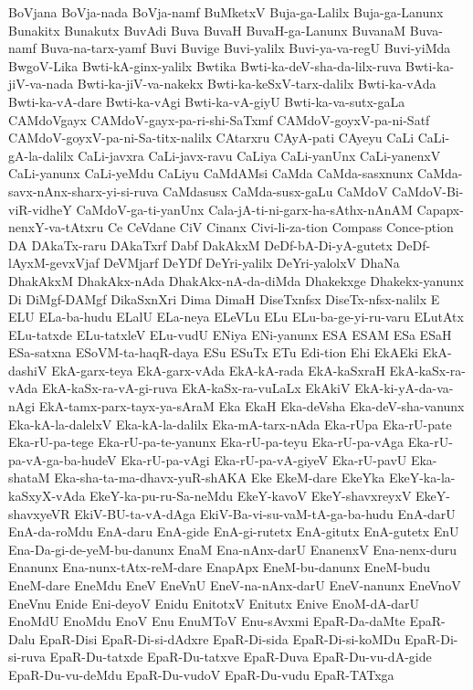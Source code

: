{BoVjana
BoVja-nada
BoVja-namf
BuMketxV
Buja-ga-Lalilx
Buja-ga-Lanunx
Bunakitx
Bunakutx
BuvAdi
Buva
BuvaH
BuvaH-ga-Lanunx
BuvanaM
Buva-namf
Buva-na-tarx-yamf
Buvi
Buvige
Buvi-yalilx
Buvi-ya-va-regU
Buvi-yiMda
BwgoV-Lika
Bwti-kA-ginx-yalilx
Bwtika
Bwti-ka-deV-sha-da-lilx-ruva
Bwti-ka-jiV-va-nada
Bwti-ka-jiV-va-nakekx
Bwti-ka-keSxV-tarx-dalilx
Bwti-ka-vAda
Bwti-ka-vA-dare
Bwti-ka-vAgi
Bwti-ka-vA-giyU
Bwti-ka-va-sutx-gaLa
CAMdoVgayx
CAMdoV-gayx-pa-ri-shi-SaTxmf
CAMdoV-goyxV-pa-ni-Satf
CAMdoV-goyxV-pa-ni-Sa-titx-nalilx
CAtarxru
CAyA-pati
CAyeyu
CaLi
CaLi-gA-la-dalilx
CaLi-javxra
CaLi-javx-ravu
CaLiya
CaLi-yanUnx
CaLi-yanenxV
CaLi-yanunx
CaLi-yeMdu
CaLiyu
CaMdAMsi
CaMda
CaMda-sasxnunx
CaMda-savx-nAnx-sharx-yi-si-ruva
CaMdasusx
CaMda-susx-gaLu
CaMdoV
CaMdoV-Bi-viR-vidheY
CaMdoV-ga-ti-yanUnx
Cala-jA-ti-ni-garx-ha-sAthx-nAnAM
Capapx-nenxY-va-tAtxru
Ce
CeVdane
CiV
Cinanx
Civi-li-za-tion
Compass
Conce-ption
DA
DAkaTx-raru
DAkaTxrf
Dabf
DakAkxM
DeDf-bA-Di-yA-gutetx
DeDf-lAyxM-gevxVjaf
DeVMjarf
DeYDf
DeYri-yalilx
DeYri-yalolxV
DhaNa
DhakAkxM
DhakAkx-nAda
DhakAkx-nA-da-diMda
Dhakekxge
Dhakekx-yanunx
Di
DiMgf-DAMgf
DikaSxnXri
Dima
DimaH
DiseTxnfsx
DiseTx-nfsx-nalilx
E
ELU
ELa-ba-hudu
ELalU
ELa-neya
ELeVLu
ELu
ELu-ba-ge-yi-ru-varu
ELutAtx
ELu-tatxde
ELu-tatxleV
ELu-vudU
ENiya
ENi-yanunx
ESA
ESAM
ESa
ESaH
ESa-satxna
ESoVM-ta-haqR-daya
ESu
ESuTx
ETu
Edi-tion
Ehi
EkAEki
EkA-dashiV
EkA-garx-teya
EkA-garx-vAda
EkA-kA-rada
EkA-kaSxraH
EkA-kaSx-ra-vAda
EkA-kaSx-ra-vA-gi-ruva
EkA-kaSx-ra-vuLaLx
EkAkiV
EkA-ki-yA-da-va-nAgi
EkA-tamx-parx-tayx-ya-sAraM
Eka
EkaH
Eka-deVsha
Eka-deV-sha-vanunx
Eka-kA-la-dalelxV
Eka-kA-la-dalilx
Eka-mA-tarx-nAda
Eka-rUpa
Eka-rU-pate
Eka-rU-pa-tege
Eka-rU-pa-te-yanunx
Eka-rU-pa-teyu
Eka-rU-pa-vAga
Eka-rU-pa-vA-ga-ba-hudeV
Eka-rU-pa-vAgi
Eka-rU-pa-vA-giyeV
Eka-rU-pavU
Eka-shataM
Eka-sha-ta-ma-dhavx-yuR-shAKA
Eke
EkeM-dare
EkeYka
EkeY-ka-la-kaSxyX-vAda
EkeY-ka-pu-ru-Sa-neMdu
EkeY-kavoV
EkeY-shavxreyxV
EkeY-shavxyeVR
EkiV-BU-ta-vA-dAga
EkiV-Ba-vi-su-vaM-tA-ga-ba-hudu
EnA-darU
EnA-da-roMdu
EnA-daru
EnA-gide
EnA-gi-rutetx
EnA-gitutx
EnA-gutetx
EnU
Ena-Da-gi-de-yeM-bu-danunx
EnaM
Ena-nAnx-darU
EnanenxV
Ena-nenx-duru
Enanunx
Ena-nunx-tAtx-reM-dare
EnapApx
EneM-bu-danunx
EneM-budu
EneM-dare
EneMdu
EneV
EneVnU
EneV-na-nAnx-darU
EneV-nanunx
EneVnoV
EneVnu
Enide
Eni-deyoV
Enidu
EnitotxV
Enitutx
Enive
EnoM-dA-darU
EnoMdU
EnoMdu
EnoV
Enu
EnuMToV
Enu-sAvxmi
EpaR-Da-daMte
EpaR-Dalu
EpaR-Disi
EpaR-Di-si-dAdxre
EpaR-Di-sida
EpaR-Di-si-koMDu
EpaR-Di-si-ruva
EpaR-Du-tatxde
EpaR-Du-tatxve
EpaR-Duva
EpaR-Du-vu-dA-gide
EpaR-Du-vu-deMdu
EpaR-Du-vudoV
EpaR-Du-vudu
EpaR-TATxga
}
